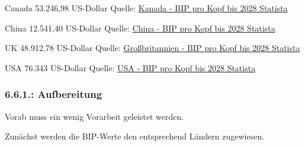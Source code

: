 \documentclass[
  letterpaper,
  DIV=11,
  numbers=noendperiod]{scrartcl}
\begin{document}
Canada 53.246,98 US-Dollar Quelle:
\href{https://de.statista.com/statistik/daten/studie/14428/umfrage/bruttoinlandsprodukt-pro-kopf-in-kanada/\#:~:text=Im\%20Jahr\%202022\%20hat\%20das\%20Bruttoinlandsprodukt\%20pro\%20Kopf,bis\%202022\%20und\%20Prognosen\%20bis\%20zum\%20Jahr\%202028.}{Kanada
- BIP pro Kopf bis 2028 \textbar{} Statista}

China 12.541,40 US-Dollar Quelle:
\href{https://de.statista.com/statistik/daten/studie/19407/umfrage/bruttoinlandsprodukt-pro-kopf-in-china/\#:~:text=Im\%20Jahr\%202022\%20hat\%20das\%20Bruttoinlandsprodukt\%20pro\%20Kopf,bis\%202022\%20und\%20Prognosen\%20bis\%20zum\%20Jahr\%202028.}{China
- BIP pro Kopf bis 2028 \textbar{} Statista}

UK 48.912,78 US-Dollar Quelle:
\href{https://de.statista.com/statistik/daten/studie/14453/umfrage/bruttoinlandsprodukt-pro-kopf-in-grossbritannien/\#:~:text=F\%C3\%BCr\%20das\%20Jahr\%202023\%20wird\%20das\%20Bruttoinlandsprodukt\%20pro,bis\%202020\%20und\%20Prognosen\%20bis\%20zum\%20Jahr\%202028.}{Großbritannien
- BIP pro Kopf bis 2028 \textbar{} Statista}

USA 76.343 US-Dollar Quelle:
\href{https://de.statista.com/statistik/daten/studie/14454/umfrage/bruttoinlandsprodukt-pro-kopf-in-den-usa/}{USA
- BIP pro Kopf bis 2028 \textbar{} Statista}

\hypertarget{aufbereitung}{%
\subsubsection{6.6.1.: Aufbereitung}\label{aufbereitung}}

Vorab muss ein wenig Vorarbeit geleistet werden.

Zunächst werden die BIP-Werte den entsprechend Ländern zugewiesen.
\end{document}
